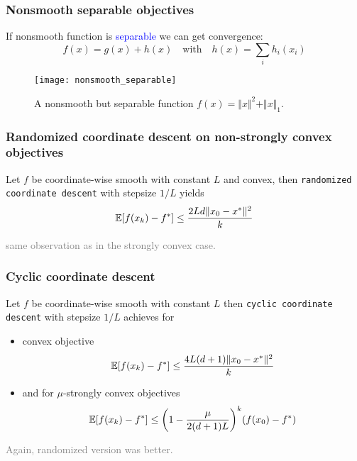 \documentclass[aspectratio=149]{beamer}
\begin{document}
\begin{frame}
  \frametitle{Nonsmooth separable objectives}
  If nonsmooth function is \textcolor{blue}{separable} we can get convergence:
  \begin{equation}
    f(x) = g(x) + h(x) \quad \text{with} \quad h(x)= \sum_{i} h_i(x_i)
  \end{equation}
  \begin{figure}[ht]
    \centering
    \texttt{[image: nonsmooth\_separable]}

    \caption{A nonsmooth but separable function $f(x)= \Vert x \Vert^2 + \Vert x \Vert_1$.}
  \end{figure}
\end{frame}




\begin{frame}
  \frametitle{Randomized coordinate descent on non-strongly convex objectives}
  \begin{theorem}
    Let $f$ be coordinate-wise smooth with constant $L$ and convex, then \colorbox{gray!30}{\textup{\texttt{randomized coordinate descent}}} with stepsize $1/L$ yields
    \begin{equation}
      \mathbb{E} [f(x_k)-f^*] \le \frac{2L d \Vert x_0-x^* \Vert^2}{k}
    \end{equation}
  \end{theorem}
  \textcolor{gray}{same observation as in the strongly convex case.}
\end{frame}


\begin{frame}
  \frametitle{Cyclic coordinate descent}
  \begin{theorem}
    Let $f$ be coordinate-wise smooth with constant $L$ then \colorbox{gray!30}{\textup{\texttt{cyclic coordinate descent}}} with stepsize $1/L$ achieves for
    \begin{itemize}
      \item convex objective
            \begin{equation}
              \mathbb{E} [f(x_k)-f^*] \le \frac{4L (d+1) \Vert x_0-x^* \Vert^2}{k}
            \end{equation}
      \item and for $\mu$-strongly convex objectives
            \begin{equation}
              \mathbb{E} [f(x_k)-f^*] \le {\left( 1- \frac{\mu}{2(d+1)L} \right)}^k (f(x_0)-f^*)
            \end{equation}
    \end{itemize}
  \end{theorem}
  \textcolor{gray}{Again, randomized version was better.}
\end{frame}
\end{document}
